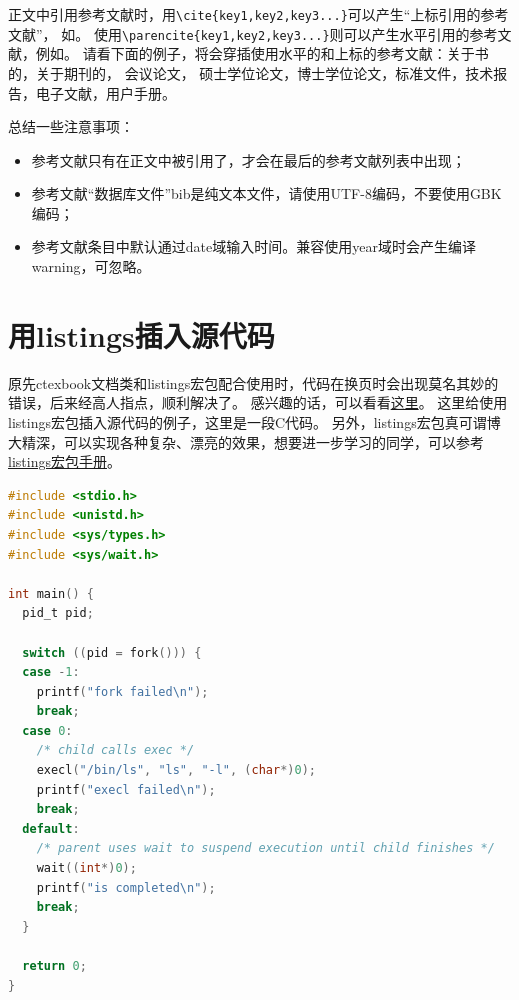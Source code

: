 \documentclass[doctor,openright,twoside]{sjtuthesis}
\theoremstyle{plain}
\theoremstyle{definition}
\theoremstyle{remark}
\theoremstyle{ocrenumbox}
\theoremstyle{plain}
\newcommand\cqh{“}
\newcommand\cqt{”}
\begin{document}
正文中引用参考文献时，用\verb+\cite{key1,key2,key3...}+可以产生\cqh 上标引用的参考文献\cqt ，
如\cite{Meta_CN,chen2007act,DPMG}。
使用\verb+\parencite{key1,key2,key3...}+则可以产生水平引用的参考文献，例如\parencite{JohnD,zhubajie,IEEE-1363}。
请看下面的例子，将会穿插使用水平的和上标的参考文献：关于书的\parencite{Meta_CN,JohnD,IEEE-1363}，关于期刊的\cite{chen2007act,chen2007ewi}，
会议论文\parencite{DPMG,kocher99,cnproceed}，
硕士学位论文\parencite{zhubajie,metamori2004}，博士学位论文\cite{shaheshang,FistSystem01,bai2008}，标准文件\parencite{IEEE-1363}，技术报告\cite{NPB2}，电子文献\parencite{xiaoyu2001, CHRISTINE1998}，用户手册\parencite{RManual}。

总结一些注意事项：

\begin{itemize}
\item 参考文献只有在正文中被引用了，才会在最后的参考文献列表中出现；
\item 参考文献\cqh 数据库文件\cqt bib是纯文本文件，请使用UTF-8编码，不要使用GBK编码；
\item 参考文献条目中默认通过date域输入时间。兼容使用year域时会产生编译warning，可忽略。
\end{itemize}

\section{用listings插入源代码}

原先ctexbook文档类和listings宏包配合使用时，代码在换页时会出现莫名其妙的错误，后来经高人指点，顺利解决了。
感兴趣的话，可以看看\href{http://bbs.ctex.org/viewthread.php?tid=53451}{这里}。
这里给使用listings宏包插入源代码的例子，这里是一段C代码。
另外，listings宏包真可谓博大精深，可以实现各种复杂、漂亮的效果，想要进一步学习的同学，可以参考
\href{http://mirror.ctan.org/macros/latex/contrib/listings/listings.pdf}{listings宏包手册}。

\begin{lstlisting}[language={C}, caption={一段C源代码}]
#include <stdio.h>
#include <unistd.h>
#include <sys/types.h>
#include <sys/wait.h>

int main() {
  pid_t pid;

  switch ((pid = fork())) {
  case -1:
    printf("fork failed\n");
    break;
  case 0:
    /* child calls exec */
    execl("/bin/ls", "ls", "-l", (char*)0);
    printf("execl failed\n");
    break;
  default:
    /* parent uses wait to suspend execution until child finishes */
    wait((int*)0);
    printf("is completed\n");
    break;
  }

  return 0;
}
\end{lstlisting}
\end{document}
